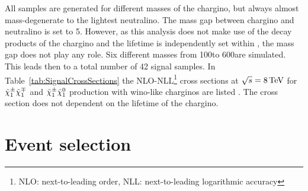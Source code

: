 All samples are generated for different masses of the chargino, but always almost mass-degenerate to the lightest neutralino.
The mass gap between chargino and neutralino is set to 5\gev.
However, as this analysis does not make use of the decay products of the chargino and the lifetime is independently set within \geant, the mass gap does not play any role.
Six different masses from 100\gev to 600\gev are simulated.
This leads then to a total number of 42 signal samples.
In Table~\ref{tab:SignalCrossSections} the NLO-NLL\footnote{NLO: next-to-leading order, NLL: next-to-leading logarithmic accuracy} cross sections at $\sqrt{s}=8\,\text{Te}\kern-0.06667em\text{V}$ for $\tilde{\chi}^{\pm}_{1}\tilde{\chi}^{\mp}_{1}$ and $\tilde{\chi}^{\pm}_{1}\tilde{\chi}^{0}_{1}$ production 
with wino-like charginos are listed \cite{bib:SignalCrossSection_2012,bib:SignalCrossSection_2013}.
The cross section does not dependent on the lifetime of the chargino.
\renewcommand{\arraystretch}{1.5}
\begin{table}[h]
\centering
\caption{Simulated signal mass points with corresponding cross sections for wino-like charginos.}
\label{tab:SignalCrossSections}
\end{table}  

\chapter{Event selection}
\label{sec:EventSelection}
